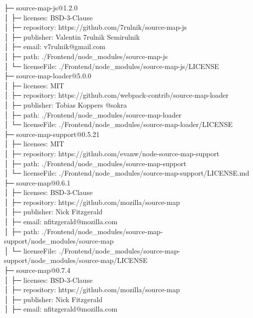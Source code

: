 ├─ source-map-js@1.2.0\\
│  ├─ licenses: BSD-3-Clause\\
│  ├─ repository: https://github.com/7rulnik/source-map-js\\
│  ├─ publisher: Valentin 7rulnik Semirulnik\\
│  ├─ email: v7rulnik@gmail.com\\
│  ├─ path: ./Frontend/node\_modules/source-map-js\\
│  └─ licenseFile: ./Frontend/node\_modules/source-map-js/LICENSE\\
├─ source-map-loader@5.0.0\\
│  ├─ licenses: MIT\\
│  ├─ repository: https://github.com/webpack-contrib/source-map-loader\\
│  ├─ publisher: Tobias Koppers @sokra\\
│  ├─ path: ./Frontend/node\_modules/source-map-loader\\
│  └─ licenseFile: ./Frontend/node\_modules/source-map-loader/LICENSE\\
├─ source-map-support@0.5.21\\
│  ├─ licenses: MIT\\
│  ├─ repository: https://github.com/evanw/node-source-map-support\\
│  ├─ path: ./Frontend/node\_modules/source-map-support\\
│  └─ licenseFile: ./Frontend/node\_modules/source-map-support/LICENSE.md\\
├─ source-map@0.6.1\\
│  ├─ licenses: BSD-3-Clause\\
│  ├─ repository: https://github.com/mozilla/source-map\\
│  ├─ publisher: Nick Fitzgerald\\
│  ├─ email: nfitzgerald@mozilla.com\\
│  ├─ path: ./Frontend/node\_modules/source-map-support/node\_modules/source-map\\
│  └─ licenseFile: ./Frontend/node\_modules/source-map-support/node\_modules/source-map/LICENSE\\
├─ source-map@0.7.4\\
│  ├─ licenses: BSD-3-Clause\\
│  ├─ repository: https://github.com/mozilla/source-map\\
│  ├─ publisher: Nick Fitzgerald\\
│  ├─ email: nfitzgerald@mozilla.com\\
